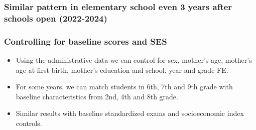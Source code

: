 \documentclass{beamer}
\begin{document}
\begin{frame}
    \label{frame:twfe_gpa_2_4_8}
    \frametitle{Similar pattern in elementary school even 3 years after schools open (2022-2024)}
        {
    }
\end{frame}


\begin{frame}
    \label{frame:twfe_gpa_controls_intro}
    \frametitle{Controlling for baseline scores and SES}
       \begin{itemize}
           \item Using the administrative data we can control for sex, mother's age, mother's age at first birth, mother's education and school, year and grade FE.
           \item For some years, we can match students in 6th, 7th and 9th grade with baseline characteristics from 2nd, 4th and 8th grade.
           \item Similar results with baseline standardized exams and socioeconomic index controls.


       \end{itemize}
\end{frame}
\end{document}
